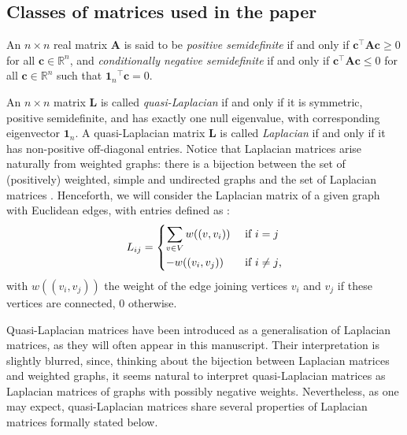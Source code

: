 \documentclass[12pt]{article}
\theoremstyle{plain}
\theoremstyle{remark}
\newcommand{\onen}[0]{{\mathbf{1}_{n}}}
\newcommand{\ie}{\textit{i.e. }}
\newcommand{\dVec}[1]{{\bm{#1}}}            %
\newcommand{\latMatr}[1]{\mathbf{#1}}          %
\newcommand{\tobi}[1]{\textcolor{teal}{#1}}
\begin{document}
\subsection{Classes of matrices used in the paper}
    An $n\times n$ real matrix $\latMatr A$ is said to be \emph{positive semidefinite} if and only if $\dVec{c}^\top \latMatr{A} \dVec{c} \geq 0$ for all $\dVec{c} \in \mathbb{R}^n$, and \emph{conditionally negative semidefinite} if and only if  $\dVec{c}^\top \latMatr{A} \dVec{c} \leq 0$ for all $\dVec{c} \in \mathbb{R}^n$ such that $\onen^\top \dVec{c} = 0$.
    

    An $n\times n$ matrix $\latMatr L$ is called \emph{quasi-Laplacian} if and only if it is symmetric, positive semidefinite, and has exactly one null eigenvalue, with corresponding eigenvector $\onen$. A quasi-Laplacian matrix $\latMatr L$ is called \emph{Laplacian} if and only if it has non-positive off-diagonal entries.
    Notice that Laplacian matrices arise naturally from weighted graphs: there is a bijection between the set of (positively) weighted, simple and undirected graphs and the set of Laplacian matrices \cite[Subsection 2.1]{devriendt_effective_2022}. Henceforth, we will consider the Laplacian matrix of a given graph with Euclidean edges, with entries defined as \citet[Equation (1)]{devriendt_effective_2022}: 
    {\begin{equation}
        \label{eq:laplacianofagraph}
        L_{ij} = 
        \begin{dcases}
            \sum_{v\in V} w((v, v_i)) &\text{ if $i=j$}\\
            -w((v_i,v_j))  &\text{ if $i \neq j$,}
        \end{dcases}
    \end{equation}
    with $w((v_i,v_j))$ the weight of the edge joining vertices $v_i$ and $v_j$ if these vertices are connected, $0$ otherwise.} \par %
    Quasi-Laplacian matrices have been introduced as a generalisation of Laplacian matrices, as they will often appear in this manuscript. Their interpretation is slightly blurred, since, thinking about the bijection between Laplacian matrices and weighted graphs, it seems natural to interpret quasi-Laplacian matrices as Laplacian matrices of graphs with possibly negative weights. Nevertheless, as one may expect, quasi-Laplacian matrices share several properties of Laplacian matrices formally stated below.
\end{document}
